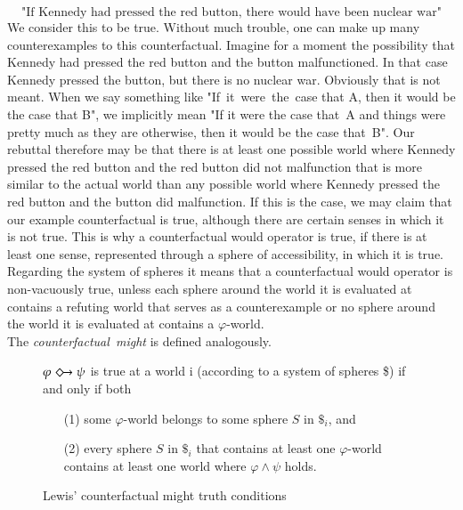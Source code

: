 \documentclass[a4paper,american,10pt]{paper}
\theoremstyle{definition}\newtheorem{definition}{Definition}
\begin{document}
\begin{equation}
\text{"If Kennedy had pressed the red button, there would have been nuclear war"}
\end{equation}
We consider this to be true. Without much trouble, one can make up many counterexamples to this counterfactual. Imagine for a moment the possibility that Kennedy had pressed the red button and the button malfunctioned. In that case Kennedy pressed the button, but there is no nuclear war. Obviously that is not meant. When we say something like "If~it~were~the~case that A, then it would be the case that B", we implicitly mean "If it were the case that~A and things were pretty much as they are otherwise, then it would be the case that~B". Our rebuttal therefore may be that there is at least one possible world where Kennedy pressed the red button and the red button did not malfunction that is more similar to the actual world than any possible world where Kennedy pressed the red button and the button did malfunction. If this is the case, we may claim that our example counterfactual is true, although there are certain senses in which it is not true. This is why a counterfactual would operator is true, if there is at least one sense, represented through a sphere of accessibility, in which it is true. Regarding the system of spheres it means that a counterfactual would operator is non-vacuously true, unless each sphere around the world it is evaluated at contains a refuting world that serves as a counterexample or no sphere around the world it is evaluated at contains a $\varphi$-world.\\
The \textit{counterfactual~might} is defined analogously.

\begin{figure}[H]
	\centering
	$\varphi\Diamondright\psi$ is true at a world i (according to a system of spheres \$) if and only if both
	\begin{itemize}
	\item[(1)] some $\varphi$-world belongs to some sphere $S$ in $\$_i$, and
	\item[(2)] every sphere $S$ in $\$_i$ that contains at least one $\varphi$-world contains at least one world where $\varphi\wedge\psi$ holds.
	\end{itemize}
	\caption{Lewis' counterfactual might truth conditions}
	\label{fig:counterfactual_might}
\end{figure}
\end{document}
